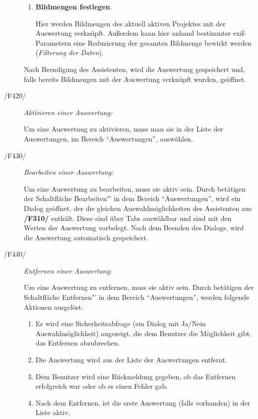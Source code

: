 \begin{description}
\begin{enumerate}
				\item \textbf{Bildmengen festlegen}.\par Hier werden Bildmengen des aktuell aktiven Projektes mit der Auswertung verknüpft. Außerdem kann hier anhand bestimmter \gls{exif}-Parametern eine Reduzierung der gesamten Bildmenge bewirkt werden (\textit{Filterung der Daten}).

			\end{enumerate}

			Nach Beendigung des Assistenten, wird die Auswertung gespeichert und, falls bereits Bildmengen mit der Auswertung verknüpft wurden, geöffnet.
		
		\item[/F420/] \textit{Aktivieren einer Auswertung:}\par Um eine Auswertung zu aktivieren, muss man sie in der Liste der Auswertungen, im Bereich "`Auswertungen"', auswählen.
		
		\item[/F430/] \textit{Bearbeiten einer Auswertung:}\par Um eine Auswertung zu bearbeiten, muss sie aktiv sein. Durch betätigen der Schaltfläche Bearbeiten"' in dem Bereich "`Auswertungen"', wird ein Dialog geöffnet, der die gleichen Auswahlmöglichkeiten des Assistenten aus \textbf{/F310/} enthält. Diese sind über Tabs auswählbar und sind mit den Werten der Auswertung vorbelegt. Nach dem Beenden des Dialogs, wird die Auswertung automatisch gespeichert.
				
		\item[/F440/] \textit{Entfernen einer Auswertung:}\par Um eine Auswertung zu entfernen, muss sie aktiv sein. Durch betätigen der Schaltfläche Entfernen"' in dem Bereich "`Auswertungen"', werden folgende Aktionen ausgelöst:

			\begin{enumerate}

				\item Es wird eine Sicherheitsabfrage (ein Dialog mit Ja/Nein Auswahlmöglichkeit) angezeigt, die dem Benutzer die Möglichkeit gibt, das Entfernen abzubrechen.

				\item Die Auswertung wird aus der Liste der Auswertungen entfernt.

				\item Dem Benutzer wird eine Rückmeldung gegeben, ob das Entfernen erfolgreich war oder ob es einen Fehler gab.

				\item Nach dem Entfernen, ist die erste Auswertung (falls vorhanden) in der Liste aktiv.

			\end{enumerate}
			
	\end{description}

